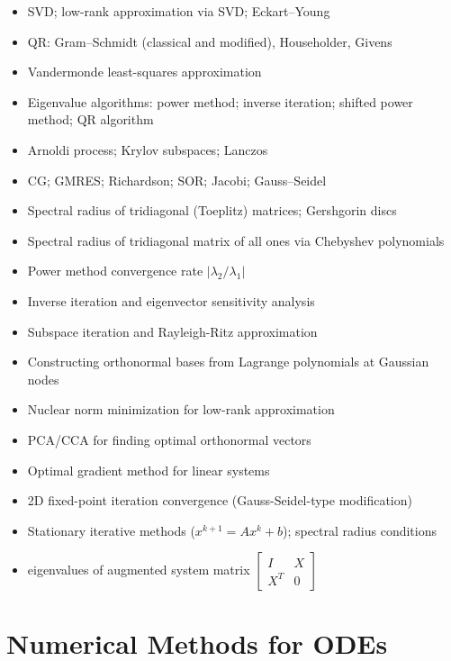 \documentclass{amsart}
\begin{document}
\begin{itemize}
  \item SVD; low-rank approximation via SVD; Eckart--Young
  \item QR: Gram--Schmidt (classical and modified), Householder, Givens
  \item Vandermonde least-squares approximation
  \item Eigenvalue algorithms: power method; inverse iteration; shifted power method; QR algorithm
  \item Arnoldi process; Krylov subspaces; Lanczos
  \item CG; GMRES; Richardson; SOR; Jacobi; Gauss--Seidel
  \item Spectral radius of tridiagonal (Toeplitz) matrices; Gershgorin discs
  \item Spectral radius of tridiagonal matrix of all ones via Chebyshev polynomials
  \item Power method convergence rate $|\lambda_2/\lambda_1|$
  \item Inverse iteration and eigenvector sensitivity analysis
  \item Subspace iteration and Rayleigh-Ritz approximation
  \item Constructing orthonormal bases from Lagrange polynomials at Gaussian nodes
  \item Nuclear norm minimization for low-rank approximation
  \item PCA/CCA for finding optimal orthonormal vectors
  \item Optimal gradient method for linear systems
  \item 2D fixed-point iteration convergence (Gauss-Seidel-type modification)
  \item Stationary iterative methods ($x^{k+1} = Ax^k + b$); spectral radius conditions
  \item eigenvalues of augmented system matrix $\begin{bmatrix} I & X \\ X^T & 0 \end{bmatrix}$
\end{itemize}

\section{Numerical Methods for ODEs}
\end{document}
